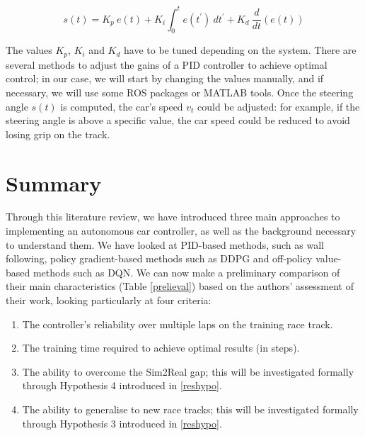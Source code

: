 \begin{equation}
	\label{pid}
	s(t) = K_p \: e(t) + K_i \int_0^{t} e(t^{'}) \: dt^{'} + K_d \: \frac{d}{dt}(e(t))
\end{equation}

The values $K_p$, $K_i$ and $K_d$ have to be tuned depending on the system. There are several methods to adjust the gains of a PID controller to achieve optimal control; in our case, we will start by changing the values manually, and if necessary, we will use some ROS packages or MATLAB tools.\newline
Once the steering angle $s(t)$ is computed, the car's speed $v_{t}$ could be adjusted: for example, if the steering angle is above a specific value, the car speed could be reduced to avoid losing grip on the track.

\section{Summary}
Through this literature review, we have introduced three main approaches to implementing an autonomous car controller, as well as the background necessary to understand them. We have looked at PID-based methods, such as wall following, policy gradient-based methods such as DDPG and off-policy value-based methods such as DQN. \newline
We can now make a preliminary comparison of their main characteristics (Table \ref{prelieval}) based on the authors' assessment of their work, looking particularly at four criteria:
\begin{enumerate}
	\item The controller's reliability over multiple laps on the training race track.
	\item The training time required to achieve optimal results (in steps).
	\item The ability to overcome the Sim2Real gap; this will be investigated formally through Hypothesis 4 introduced in \ref{reshypo}.
	\item The ability to generalise to new race tracks; this will be investigated formally through Hypothesis 3 introduced in \ref{reshypo}.
\end{enumerate}

